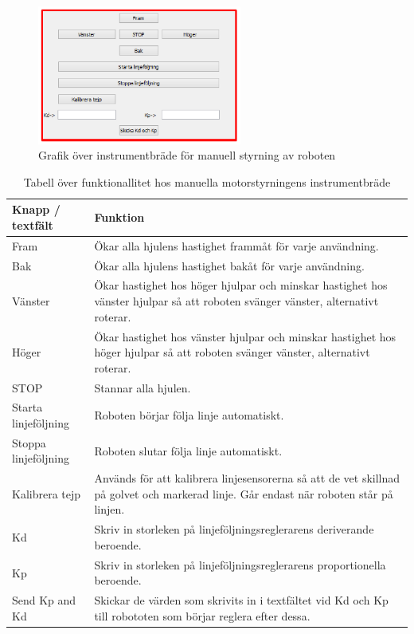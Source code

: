 \documentclass[a4paper,12pt]{article}
\begin{document}
\begin{figure}[H]
	\centering
	\includegraphics[width=0.6\textwidth]{man_motor1.pdf}
	\caption{Grafik över instrumentbräde för manuell styrning av roboten}
	\label{fig:pc_motor}
\end{figure}

\begin{table}[H]
\centering
\begin{tabularx}{\textwidth}{|l|X|}
\hline \textbf{Knapp / textfält} & \textbf{Funktion} \\ \hline
Fram & Ökar alla hjulens hastighet frammåt för varje användning. \\ \hline
Bak & Ökar alla hjulens hastighet bakåt för varje användning. \\ \hline
Vänster & Ökar hastighet hos höger hjulpar och minskar hastighet hos vänster hjulpar så att roboten svänger vänster, alternativt roterar. \\ \hline
Höger & Ökar hastighet hos vänster hjulpar och minskar hastighet hos höger hjulpar så att roboten svänger vänster, alternativt roterar. \\ \hline
STOP & Stannar alla hjulen. \\ \hline
Starta linjeföljning & Roboten börjar följa linje automatiskt. \\ \hline
Stoppa linjeföljning & Roboten slutar följa linje automatiskt. \\ \hline
Kalibrera tejp & Används för att kalibrera linjesensorerna så att de vet skillnad på golvet och markerad linje. Går endast när roboten står på linjen. \\ \hline
Kd & Skriv in storleken på linjeföljningsreglerarens deriverande beroende. \\ \hline
Kp & Skriv in storleken på linjeföljningsreglerarens proportionella beroende. \\ \hline
Send Kp and Kd & Skickar de värden som skrivits in i textfältet vid Kd och Kp till robototen som börjar reglera efter dessa. \\ \hline

\end{tabularx}
\caption{Tabell över funktionallitet hos manuella motorstyrningens instrumentbräde}
\label{tab:motor}
\end{table}
\end{document}
